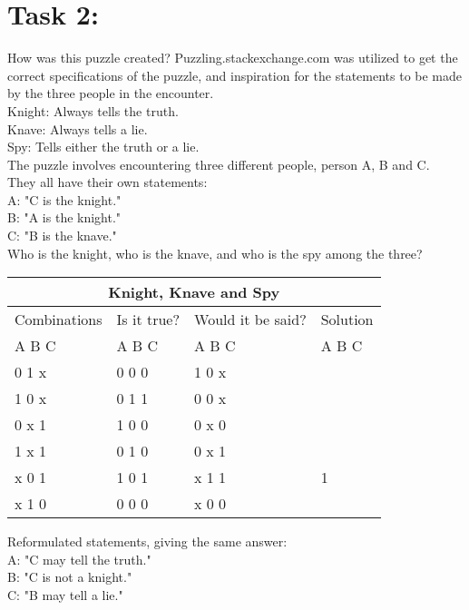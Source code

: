 \documentclass[11pt]{amsart}
\begin{document}
\section{Task 2:}

How was this puzzle created?
	Puzzling.stackexchange.com was utilized to get the correct specifications of the puzzle,
	and inspiration for the statements to be made by the three people in the encounter. \\

Knight: Always tells the truth.\\
Knave: 	Always tells a lie.\\
Spy: 		Tells either the truth or a lie. \\

The puzzle involves encountering three different people, person A, B and C. \\

They all have their own statements: \\

	A: "C is the knight."\\
	B: "A is the knight."\\
	C: "B is the knave." \\

Who is the knight, who is the knave, and who is the spy among the three? \\

\begin{tabular}{ |p{3cm}||p{3cm}|p{3cm}|p{3cm}|  }
 \hline
 \multicolumn{4}{|c|}{Knight, Knave and Spy} \\
 \hline
 Combinations & Is it true? & Would it be said? & Solution  \\ A  B  C   &   A  B  C  &   A  B  C & A  B  C \\
 \hline
	0   1   x  	& 0	0	0   & 1 0 x &  \\
	1   0   x		& 0	1	1  	& 0 0 x &  \\
	0   x   1 	&	1	0	0 	& 0 x 0 &  \\
	1   x   1  	&	0	1	0 	& 0 x 1 &  \\
	x   0   1		& 1	0	1  	& x 1 1 & 1\\
	x   1   0		& 0	0	0  	& x 0 0 &  \\

 \hline
\end{tabular}

Reformulated statements, giving the same answer:\\

	A: "C may tell the truth."\\
	B: "C is not a knight."\\
	C: "B may tell a lie." \\
\end{document}
